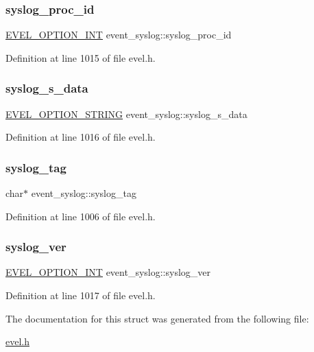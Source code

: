 \subsubsection{\texorpdfstring{syslog\+\_\+proc\+\_\+id}{syslog\_proc\_id}}
{\footnotesize\ttfamily \hyperlink{evel_8h_a452d825778d1c2368a54b8f689a25ba7}{E\+V\+E\+L\+\_\+\+O\+P\+T\+I\+O\+N\+\_\+\+I\+NT} event\+\_\+syslog\+::syslog\+\_\+proc\+\_\+id}



Definition at line 1015 of file evel.\+h.

\hypertarget{structevent__syslog_a344ff4a09974d2022f451ed19f152ecf}{}\label{structevent__syslog_a344ff4a09974d2022f451ed19f152ecf} 
\subsubsection{\texorpdfstring{syslog\+\_\+s\+\_\+data}{syslog\_s\_data}}
{\footnotesize\ttfamily \hyperlink{evel_8h_a0de5113a7b72de93c0c7b644f7ea7ec3}{E\+V\+E\+L\+\_\+\+O\+P\+T\+I\+O\+N\+\_\+\+S\+T\+R\+I\+NG} event\+\_\+syslog\+::syslog\+\_\+s\+\_\+data}



Definition at line 1016 of file evel.\+h.

\hypertarget{structevent__syslog_a3557ae21ae635972d45ca3153b6c2dd5}{}\label{structevent__syslog_a3557ae21ae635972d45ca3153b6c2dd5} 
\subsubsection{\texorpdfstring{syslog\+\_\+tag}{syslog\_tag}}
{\footnotesize\ttfamily char$\ast$ event\+\_\+syslog\+::syslog\+\_\+tag}



Definition at line 1006 of file evel.\+h.

\hypertarget{structevent__syslog_abcc8429fda3a05591c3e706def0e3e67}{}\label{structevent__syslog_abcc8429fda3a05591c3e706def0e3e67} 
\subsubsection{\texorpdfstring{syslog\+\_\+ver}{syslog\_ver}}
{\footnotesize\ttfamily \hyperlink{evel_8h_a452d825778d1c2368a54b8f689a25ba7}{E\+V\+E\+L\+\_\+\+O\+P\+T\+I\+O\+N\+\_\+\+I\+NT} event\+\_\+syslog\+::syslog\+\_\+ver}



Definition at line 1017 of file evel.\+h.



The documentation for this struct was generated from the following file\+:\begin{DoxyCompactItemize}
\item 
\hyperlink{evel_8h}{evel.\+h}\end{DoxyCompactItemize}
